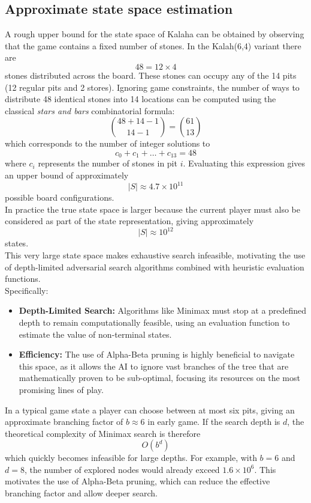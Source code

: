 \documentclass[a4paper,11pt]{article}
\begin{document}
\subsection*{Approximate state space estimation}
A rough upper bound for the state space of Kalaha can be obtained by observing that the game contains a fixed number of stones. In the Kalah(6,4) variant there are
\[
48 = 12 \times 4
\]
stones distributed across the board. These stones can occupy any of the 14 pits (12 regular pits and 2 stores). Ignoring game constraints, the number of ways to distribute 48 identical stones into 14 locations can be computed using the classical \textit{stars and bars} combinatorial formula:
\[
\binom{48 + 14 - 1}{14 - 1} = \binom{61}{13}
\]
which corresponds to the number of integer solutions to
\[
c_0 + c_1 + \dots + c_{13} = 48
\]
where $c_i$ represents the number of stones in pit $i$.
Evaluating this expression gives an upper bound of approximately
\[
|S| \approx 4.7 \times 10^{11}
\]
possible board configurations. \\
In practice the true state space is larger because the current player must also be considered as part of the state representation, giving approximately
\[
|S| \approx 10^{12}
\]
states. \\
This very large state space makes exhaustive search infeasible, motivating the use of depth-limited adversarial search algorithms combined with heuristic evaluation functions. \\%
Specifically:
\begin{itemize}
    \item \textbf{Depth-Limited Search:} Algorithms like Minimax must stop at a predefined depth to remain computationally feasible, using an evaluation function to estimate the value of non-terminal states.
    \item \textbf{Efficiency:} The use of Alpha-Beta pruning is highly beneficial to navigate this space, as it allows the AI to ignore vast branches of the tree that are mathematically proven to be sub-optimal, focusing its resources on the most promising lines of play.
\end{itemize}
In a typical game state a player can choose between at most six pits, giving an approximate branching factor of $b \approx 6$ in early game. If the search depth is $d$, the theoretical complexity of Minimax search is therefore \[O(b^d)\]
which quickly becomes infeasible for large depths. For example, with $b=6$ and $d=8$, the number of explored nodes would already exceed $1.6\times10^6$. This motivates the use of Alpha-Beta pruning, which can reduce the effective branching factor and allow deeper search.
\end{document}
